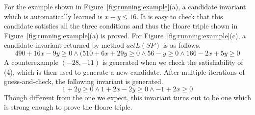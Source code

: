 \begin{example}
For the example shown in Figure~\ref{fig:running:example}(a), a candidate invariant which is automatically learned is $x - y \leq 16$. It is easy to check that this candidate satisfies all the three conditions and thus the Hoare triple shown in Figure~\ref{fig:running:example}(a) is proved. For Figure~\ref{fig:running:example}(c), a candidate invariant returned by method $actL(SP)$ is as follows.
\[
490 + 16x - 9y \geq 0 \land  (510 + 6x + 29y \geq 0 \land 56 - y \geq 0 \land 166 - 2x + 5y \geq 0
\]
A counterexample $(-28, -11)$ is generated when we check the satisfiability of (4), which is then used to generate a new candidate. After multiple iterations of guess-and-check, the following invariant is generated.
\[
1 + 2y \geq 0 \land 1 + 2x - 2y \geq 0 \land -1 + 2x \geq 0
\]
Though different from the one we expect, this invariant turns out to be one which is strong enough to prove the Hoare triple.
\end{example}



